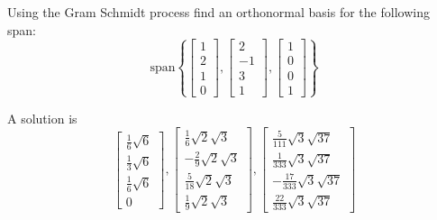 \documentclass{ximera}
\begin{document}
\begin{problem} Using the Gram Schmidt process find an
orthonormal basis for the following span:
\[
\mbox{span}\left\{ \left[
\begin{array}{r}
 1 \\
2 \\
1 \\
0
\end{array}
\right]
,\left[
\begin{array}{r}
2 \\
-1 \\
3 \\
1
\end{array}
\right] , \left[
\begin{array}{r}
 1 \\
0 \\
0 \\
1
\end{array}
\right] \right\}
\]
\begin{hint}
A solution is
\[
\left[
\begin{array}{c}
\frac{1}{6}\sqrt{6} \\
\frac{1}{3}\sqrt{6} \\
\frac{1}{6}\sqrt{6} \\
0
\end{array}
\right] ,\left[
\begin{array}{c}
\frac{1}{6}\sqrt{2}\sqrt{3} \\
-\frac{2}{9}\sqrt{2}\sqrt{3} \\
\frac{5}{18}\sqrt{2}\sqrt{3} \\
\frac{1}{9}\sqrt{2}\sqrt{3}
\end{array}
\right] ,\left[
\begin{array}{c}
\frac{5}{111}\sqrt{3}\sqrt{37} \\
\frac{1}{333}\sqrt{3}\sqrt{37} \\
-\frac{17}{333}\sqrt{3}\sqrt{37} \\
\frac{22}{333}\sqrt{3}\sqrt{37}
\end{array}
\right]
\]
\end{hint}
\end{problem}
\end{document}
